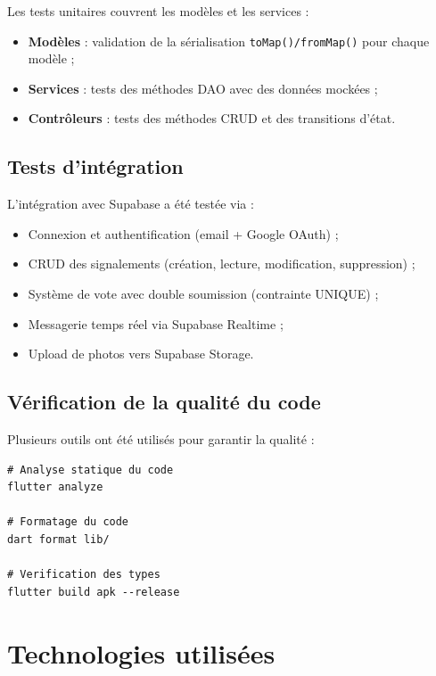\documentclass[12pt,a4paper]{report}
\begin{document}
Les tests unitaires couvrent les modèles et les services :

\begin{itemize}
    \item \textbf{Modèles} : validation de la sérialisation \texttt{toMap()/fromMap()} pour chaque modèle ;
    \item \textbf{Services} : tests des méthodes DAO avec des données mockées ;
    \item \textbf{Contrôleurs} : tests des méthodes CRUD et des transitions d'état.
\end{itemize}

\subsection{Tests d'intégration}

L'intégration avec Supabase a été testée via :
\begin{itemize}
    \item Connexion et authentification (email + Google OAuth) ;
    \item CRUD des signalements (création, lecture, modification, suppression) ;
    \item Système de vote avec double soumission (contrainte UNIQUE) ;
    \item Messagerie temps réel via Supabase Realtime ;
    \item Upload de photos vers Supabase Storage.
\end{itemize}

\subsection{Vérification de la qualité du code}

Plusieurs outils ont été utilisés pour garantir la qualité :

\begin{lstlisting}[style=codeblock, caption=Commandes de verification de qualite]
# Analyse statique du code
flutter analyze

# Formatage du code
dart format lib/

# Verification des types
flutter build apk --release
\end{lstlisting}

\section{Technologies utilisées}
\label{sec:technologies}
\end{document}
